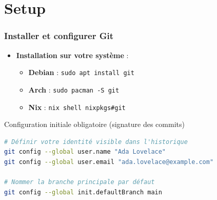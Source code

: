 \documentclass[
	11pt,
	aspectratio=169
]{beamer}
\begin{document}
\section{Setup}

\begin{frame}[fragile]
    \frametitle{Installer et configurer Git}
    \begin{itemize}
        \item \textbf{Installation sur votre système} :
        \begin{itemize}
            \item \textbf{Debian} : \texttt{sudo apt install git}
            \item \textbf{Arch} : \texttt{sudo pacman -S git}
            \item \textbf{Nix} : \texttt{nix shell nixpkgs\#git}
        \end{itemize}
    \end{itemize}

    \begin{block}{Configuration initiale obligatoire (signature des commits)}
\begin{lstlisting}[language=bash]
# Définir votre identité visible dans l'historique
git config --global user.name "Ada Lovelace"
git config --global user.email "ada.lovelace@example.com"

# Nommer la branche principale par défaut
git config --global init.defaultBranch main
\end{lstlisting}
    \end{block}
\end{frame}
\end{document}
